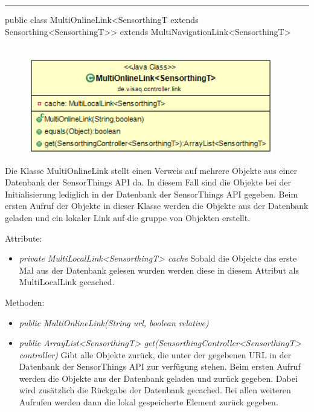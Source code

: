 \rule{\textwidth}{0.4pt}
public class MultiOnlineLink<SensorthingT extends Sensorthing<SensorthingT>> extends MultiNavigationLink<SensorthingT>
\\\\
\begin{minipage}{0.4\textwidth}
    \begin{figure}[H]
        {\centering\includegraphics[width=0.95\textwidth]{media/backend/controller/classes/MultiOnlineLink.png}}
    \end{figure}
    \end{minipage} \hfill
\begin{minipage}{0.6\textwidth}
    Die Klasse MultiOnlineLink stellt einen Verweis auf mehrere Objekte aus einer Datenbank der \gls{SensorThings API} da.
    In diesem Fall sind die Objekte bei der Initialisierung lediglich in der Datenbank der \gls{SensorThings API} gegeben.
    Beim ersten Aufruf der Objekte in dieser Klasse werden die Objekte aus der Datenbank geladen und ein lokaler Link auf die gruppe von Objekten erstellt.
\end{minipage}

Attribute:
\begin{itemize}
    \item \emph{private MultiLocalLink<SensorthingT> cache} Sobald die Objekte das erste Mal aus der Datenbank gelesen wurden werden diese in diesem Attribut als MultiLocalLink gecached.
\end{itemize}
Methoden:
\begin{itemize}
    \item \emph{public MultiOnlineLink(String url, boolean relative)}
    \relativeDescription
    \item \emph{public ArrayList<SensorthingT> get(SensorthingController<SensorthingT> controller)}
    Gibt alle Objekte zurück, die unter der gegebenen URL in der Datenbank der \gls{SensorThings API} zur verfügung stehen.
    Beim ersten Aufruf werden die Objekte aus der Datenbank geladen und zurück gegeben.
    Dabei wird zusätzlich die Rückgabe der Datenbank gecached.
    Bei allen weiteren Aufrufen werden dann die lokal gespeicherte Element zurück gegeben.
\end{itemize}